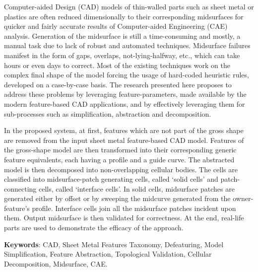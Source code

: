 Computer-aided Design (CAD) models of thin-walled parts such as sheet metal or plastics are often reduced dimensionally to their corresponding midsurfaces for quicker and fairly accurate results of Computer-aided Engineering (CAE) analysis. Generation of the midsurface is still a time-consuming and mostly, a manual task due to lack of robust and automated techniques.  Midsurface failures manifest in the form of gaps, overlaps, not-lying-halfway, etc., which can take hours or even days to correct. Most of the existing techniques work on the complex final shape of the model forcing the usage of hard-coded heuristic rules, developed on a case-by-case basis. The research presented here proposes to address these problems by leveraging feature-parameters, made available by the modern feature-based CAD applications, and by effectively leveraging them for sub-processes such as simplification, abstraction and decomposition. 

In the proposed system, at first, features which are not part of the gross shape are removed from the input sheet metal feature-based CAD model. Features of the gross-shape model are then transformed into their corresponding generic feature equivalents, each having a profile and a guide curve. The abstracted model is then decomposed into non-overlapping cellular bodies. The cells are classified into midsurface-patch generating cells, called `solid cells' and patch-connecting cells, called `interface cells'. In solid cells, midsurface patches are generated either by offset or by sweeping the midcurve generated from the owner-feature's profile. Interface cells join all the midsurface patches incident upon them. Output midsurface is then validated for correctness. At the end, real-life parts are used to demonstrate the efficacy of the approach.

\vspace{0.25cm}

\textbf{Keywords}: CAD, Sheet Metal Features Taxonomy, Defeaturing, Model Simplification, Feature Abstraction, Topological Validation, Cellular Decomposition, Midsurface, CAE.

